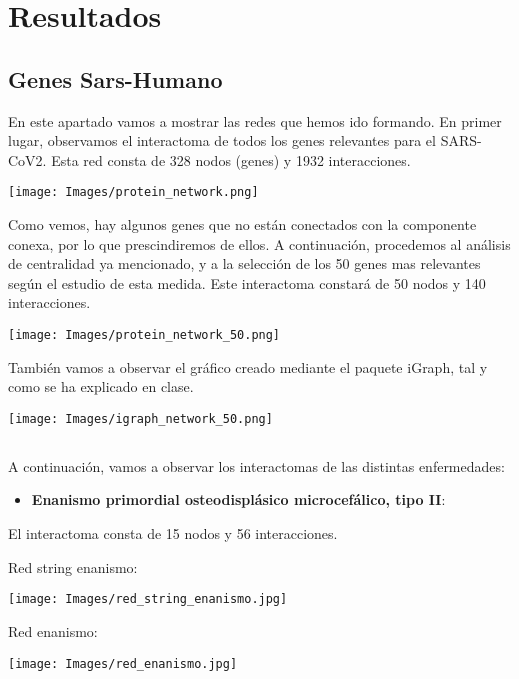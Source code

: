 \newpage
\section{Resultados}

    \subsection{Genes Sars-Humano}
        En este apartado vamos a mostrar las redes que hemos ido formando.
        En primer lugar, observamos el interactoma de todos los genes relevantes para el SARS-CoV2. Esta red consta de 328 nodos (genes) y 1932 interacciones. 
        
        \texttt{[image: Images/protein\_network.png]}
    
        Como vemos, hay algunos genes que no están conectados con la componente conexa, por lo que prescindiremos de ellos. A continuación, procedemos al análisis de centralidad ya mencionado, y a la selección de los 50 genes mas relevantes según el estudio de esta medida. Este interactoma constará de 50 nodos y 140 interacciones.
        
        \texttt{[image: Images/protein\_network\_50.png]}
    
        También vamos a observar el gráfico creado mediante el paquete iGraph, tal y como se ha explicado en clase. 
        
        \texttt{[image: Images/igraph\_network\_50.png]}
    
    \subsection{}
        A continuación, vamos a observar los interactomas de las distintas enfermedades:
        
        \begin{itemize}
            \item \textbf{Enanismo primordial osteodisplásico microcefálico, tipo II}:
        \end{itemize}
            El interactoma consta de 15 nodos y 56 interacciones.
            
        Red string enanismo:
        
        \texttt{[image: Images/red\_string\_enanismo.jpg]}
        
        Red enanismo:
        
        \texttt{[image: Images/red\_enanismo.jpg]}
        

